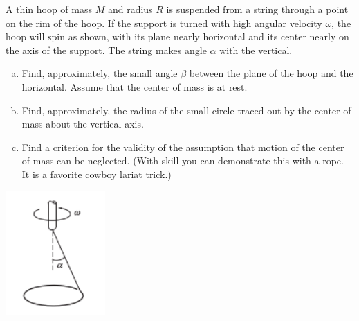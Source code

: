\documentclass[12pt,letterpaper]{hmcpset}
\begin{document}
\begin{problem}
    A thin hoop of mass $M$ and radius $R$ is suspended
    from a string through a point on the rim of the hoop.
    If the support is turned with high angular velocity
    $\omega$, the hoop will spin as shown, with its plane
    nearly horizontal and its center nearly on the axis of
    the support. The string makes angle $\alpha$ with the
    vertical.

    \begin{enumerate}[(a)]
        \item Find, approximately, the small angle $\beta$ between
            the plane of the hoop and the horizontal. Assume that
            the center of mass is at rest.
        \item Find, approximately, the radius of the small circle
            traced out by the center of mass about the vertical axis.
        \item Find a criterion for the validity of the assumption
            that motion of the center of mass can be neglected.
            (With skill you can demonstrate this with a rope. It is a
            favorite cowboy lariat trick.)
    \end{enumerate}

    \begin{center}
        \includegraphics[width=1.5in]{img/8_7}
    \end{center}
\end{problem}
\begin{solution}
    \vfill
\end{solution}
\clearpage
\end{document}
